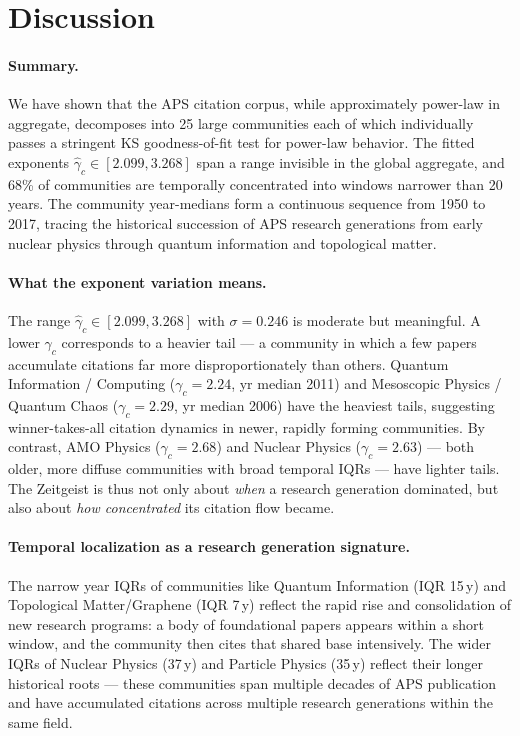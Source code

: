\documentclass[runningheads]{llncs}
\begin{document}
\section{Discussion}
\label{sec:discussion}

\paragraph{Summary.}
We have shown that the APS citation corpus, while approximately power-law in
aggregate, decomposes into 25 large communities each of which individually
passes a stringent KS goodness-of-fit test for power-law behavior.  The
fitted exponents $\hat{\gamma}_c \in [2.099, 3.268]$ span a range invisible in
the global aggregate, and 68\% of communities are temporally concentrated into
windows narrower than 20 years.  The community year-medians form a continuous
sequence from 1950 to 2017, tracing the historical succession of APS research
generations from early nuclear physics through quantum information and
topological matter.

\paragraph{What the exponent variation means.}
The range $\hat{\gamma}_c \in [2.099, 3.268]$ with $\sigma = 0.246$ is
moderate but meaningful.  A lower $\gamma_c$ corresponds to a heavier tail ---
a community in which a few papers accumulate citations far more
disproportionately than others.  Quantum Information / Computing ($\gamma_c =
2.24$, yr median 2011) and Mesoscopic Physics / Quantum Chaos ($\gamma_c = 2.29$,
yr median 2006) have the heaviest tails, suggesting winner-takes-all citation
dynamics in newer, rapidly forming communities.  By contrast, AMO Physics
($\gamma_c = 2.68$) and Nuclear Physics ($\gamma_c = 2.63$) --- both older,
more diffuse communities with broad temporal IQRs --- have lighter tails.  The
Zeitgeist is thus not only about \emph{when} a research generation dominated,
but also about \emph{how concentrated} its citation flow became.

\paragraph{Temporal localization as a research generation signature.}
The narrow year IQRs of communities like Quantum Information (IQR 15\,y) and
Topological Matter/Graphene (IQR 7\,y) reflect the rapid rise and consolidation
of new research programs: a body of foundational papers appears within a short
window, and the community then cites that shared base intensively.  The
wider IQRs of Nuclear Physics (37\,y) and Particle Physics (35\,y) reflect their
longer historical roots --- these communities span multiple decades of APS
publication and have accumulated citations across multiple research generations
within the same field.
\end{document}
